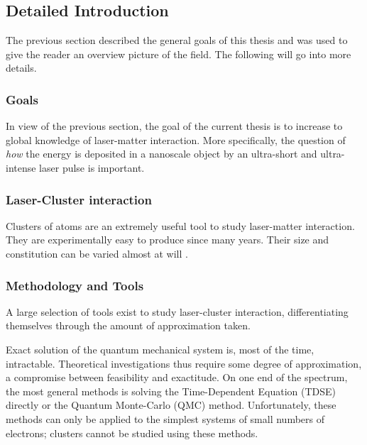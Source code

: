 \subsection{Detailed Introduction}

The previous section described the general goals of this thesis and was used to
give the reader an overview picture of the field. The following will go
into more details.

\subsubsection{Goals}
In view of the previous section, the goal of the current thesis is to increase
to global knowledge of laser-matter interaction. More specifically, the
question of \textit{how} the energy is deposited in a nanoscale object by an
ultra-short and ultra-intense laser pulse is important.

\cite{Young2010,Chapman2011}

\subsubsection{Laser-Cluster interaction}


\label{section:intro:clusters:clusters}

Clusters of atoms are an extremely useful tool to study laser-matter
interaction. They are experimentally easy to produce since many
years\cite{Haberland1994}. Their size and constitution can be varied almost at
will \cite{Martin1996}.

\cite{Fennel2010}

\label{section:intro:clusters:heating}



\subsubsection{Methodology and Tools}
A large selection of tools exist to study laser-cluster interaction,
differentiating themselves through the amount of approximation taken.

Exact solution of the quantum mechanical system is, most of the time,
intractable. Theoretical investigations thus require some degree of
approximation, a compromise between feasibility and exactitude. On one end of
the spectrum, the most general methods is solving the
Time-Dependent \schrodinger Equation (TDSE) directly or the Quantum Monte-Carlo
(QMC) method. Unfortunately, these methods can only be applied to the simplest
systems of small numbers of electrons; clusters cannot be studied using these
methods.

